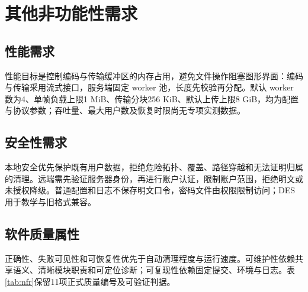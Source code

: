 \section{其他非功能性需求}
\subsection{性能需求}
性能目标是控制编码与传输缓冲区的内存占用，避免文件操作阻塞图形界面：编码与传输采用流式接口，服务端固定 worker 池，长度先校验再分配。默认 worker 数为4、单帧负载上限1 MiB、传输分块256 KiB、默认上传上限8 GiB，均为配置与协议参数；吞吐量、最大用户数及恢复时限尚无专项实测数据。
\subsection{安全性需求}
本地安全优先保护既有用户数据，拒绝危险拓扑、覆盖、路径穿越和无法证明归属的清理。远端需先验证服务器身份，再进行账户认证，限制账户范围，拒绝明文或未授权降级。普通配置和日志不保存明文口令，密码文件由权限限制访问；DES 用于教学与旧格式兼容。
\subsection{软件质量属性}
正确性、失败可见性和可恢复性优先于自动清理程度与运行速度。可维护性依赖共享语义、清晰模块职责和可定位诊断；可复现性依赖固定提交、环境与日志。表\ref{tab:nfr}保留11项正式质量编号及可验证判据。

